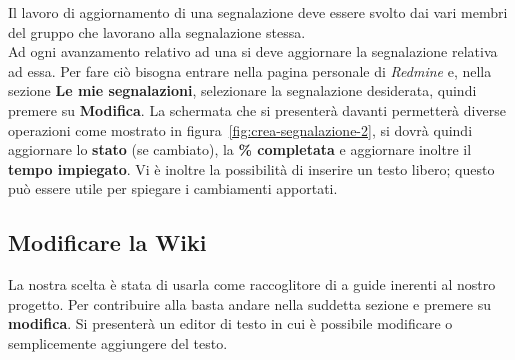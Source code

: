 \documentclass{scalatekids-article}
\begin{document}
Il lavoro di aggiornamento di una segnalazione deve essere svolto dai vari
membri del gruppo che lavorano alla segnalazione stessa.\\ Ad ogni avanzamento
relativo ad una  si deve aggiornare la segnalazione relativa ad
essa. Per fare ciò bisogna entrare nella pagina personale di \textit{Redmine} e,
nella sezione \textbf{Le mie segnalazioni}, selezionare la segnalazione
desiderata, quindi premere su \textbf{Modifica}. La schermata che si presenterà
davanti permetterà diverse operazioni come mostrato in figura~\ref{fig:crea-segnalazione-2},
si dovrà quindi aggiornare lo \textbf{stato} (se
cambiato), la \textbf{\% completata} e aggiornare inoltre il \textbf{tempo
  impiegato}. Vi è inoltre la possibilità di inserire un testo libero; questo
può essere utile per spiegare i cambiamenti apportati.

\subsection{Modificare la Wiki}

La nostra scelta è stata di usarla come raccoglitore di  a guide inerenti al nostro progetto.
Per contribuire alla  basta andare nella suddetta sezione e premere su \textbf{modifica}. Si presenterà un editor di testo in cui è possibile modificare o semplicemente aggiungere del testo.

\listoffigures
\end{document}
